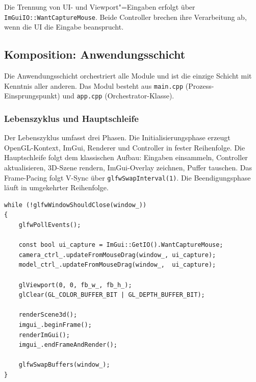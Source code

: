             Die Trennung von \ac{UI}- und Viewport"=Eingaben erfolgt über \texttt{ImGuiIO::\allowbreak WantCaptureMouse}.
            Beide Controller brechen ihre Verarbeitung ab, wenn die \ac{UI} die Eingabe beansprucht.

        \subsection{Komposition: Anwendungsschicht}\label{subsec:impl-medusa-app}
            Die Anwendungsschicht orchestriert alle Module und ist die einzige Schicht mit Kenntnis aller anderen.
            Das Modul besteht aus \texttt{main.cpp} (Prozess-Einsprungspunkt) und \texttt{app.cpp} (Orchestrator-Klasse).

            \subsubsection{Lebenszyklus und Hauptschleife}\label{subsubsec:impl-medusa-main-loop}
                Der Lebenszyklus umfasst drei Phasen.
                Die Initialisierungsphase erzeugt \ac{OpenGL}-Kontext, ImGui, Renderer und Controller in fester Reihenfolge.
                Die Hauptschleife folgt dem klassischen Aufbau: Eingaben einsammeln, Controller aktualisieren, 3D-Szene rendern, ImGui-Overlay zeichnen, Puffer tauschen.
                Das Frame-Pacing folgt V-Sync über \texttt{glfwSwapInterval(1)}.
                Die Beendigungsphase läuft in umgekehrter Reihenfolge.

                \begin{lstlisting}[style=cppStyle, caption={Aufbau der Hauptschleife.}, label={lst:impl-medusa-loop}]
while (!glfwWindowShouldClose(window_))
{
    glfwPollEvents();

    const bool ui_capture = ImGui::GetIO().WantCaptureMouse;
    camera_ctrl_.updateFromMouseDrag(window_, ui_capture);
    model_ctrl_.updateFromMouseDrag(window_,  ui_capture);

    glViewport(0, 0, fb_w_, fb_h_);
    glClear(GL_COLOR_BUFFER_BIT | GL_DEPTH_BUFFER_BIT);

    renderScene3d();
    imgui_.beginFrame();
    renderImGui();
    imgui_.endFrameAndRender();

    glfwSwapBuffers(window_);
}
                \end{lstlisting}


